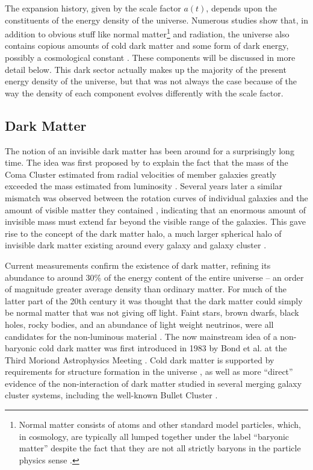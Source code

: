 The expansion history, given by the scale factor $a(t)$, depends upon the constituents of the energy density of the universe. Numerous studies show that, in addition to obvious stuff like normal matter\footnote{Normal matter consists of atoms and other standard model particles, which, in cosmology, are typically all lumped together under the label ``baryonic matter'' despite the fact that they are not all strictly baryons in the particle physics sense \citep{RydenText}.} and radiation, the universe also contains copious amounts of cold dark matter and some form of dark energy, possibly a cosmological constant \citep{DodelsonText}. These components will be discussed in more detail below. This dark sector actually makes up the majority of the present energy density of the universe, but that was not always the case because of the way the density of each component evolves differently with the scale factor.

\subsection{Dark Matter}
\label{sec:DM}

The notion of an invisible dark matter has been around for a surprisingly long time. The idea was first proposed by \citet{Zwicky33} to explain the fact that the mass of the Coma Cluster estimated from radial velocities of member galaxies greatly exceeded the mass estimated from luminosity \citep[see also][]{Zwicky37}. Several years later a similar mismatch was observed between the rotation curves of individual galaxies and the amount of visible matter they contained \citep{Babcock39}, indicating that an enormous amount of invisible mass must extend far beyond the visible range of the galaxies. This gave rise to the concept of the dark matter halo, a much larger spherical halo of invisible dark matter existing around every galaxy and galaxy cluster \citep[see][for a review of dark matter's discovery]{Bergh99}.

Current measurements confirm the existence of dark matter, refining its abundance to around 30\% of the energy content of the entire universe -- an order of magnitude greater average density than ordinary matter. For much of the latter part of the 20th century it was thought that the dark matter could simply be normal matter that was not giving off light. Faint stars, brown dwarfs, black holes, rocky bodies, and an abundance of light weight neutrinos, were all candidates for the non-luminous material \citep{Bergh99}. The now mainstream idea of a non-baryonic cold dark matter was first introduced in 1983 by Bond et al. at the Third Moriond Astrophysics Meeting \citet{Bond83}. Cold dark matter is supported by requirements for structure formation in the universe \citep{BS01}, as well as more ``direct'' evidence of the non-interaction of dark matter studied in several merging galaxy cluster systems, including the well-known Bullet Cluster \citep{Clowe06}.

